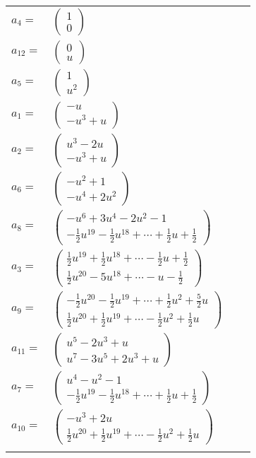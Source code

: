 \documentclass[1p]{elsarticle_modified}
\theoremstyle{definition}
\begin{document}
\begin{tabular}{m{7pt} m{180pt} m{7pt} m{180pt} }
\flushright $a_{4}=$&$\begin{pmatrix}1\\0\end{pmatrix}$ \\
\flushright $a_{12}=$&$\begin{pmatrix}0\\u\end{pmatrix}$ \\
\flushright $a_{5}=$&$\begin{pmatrix}1\\u^2\end{pmatrix}$ \\
\flushright $a_{1}=$&$\begin{pmatrix}- u\\- u^3+u\end{pmatrix}$ \\
\flushright $a_{2}=$&$\begin{pmatrix}u^3-2 u\\- u^3+u\end{pmatrix}$ \\
\flushright $a_{6}=$&$\begin{pmatrix}- u^2+1\\- u^4+2 u^2\end{pmatrix}$ \\
\flushright $a_{8}=$&$\begin{pmatrix}- u^6+3 u^4-2 u^2-1\\-\frac{1}{2} u^{19}-\frac{1}{2} u^{18}+\cdots+\frac{1}{2} u+\frac{1}{2}\end{pmatrix}$ \\
\flushright $a_{3}=$&$\begin{pmatrix}\frac{1}{2} u^{19}+\frac{1}{2} u^{18}+\cdots-\frac{1}{2} u+\frac{1}{2}\\\frac{1}{2} u^{20}-5 u^{18}+\cdots- u-\frac{1}{2}\end{pmatrix}$ \\
\flushright $a_{9}=$&$\begin{pmatrix}-\frac{1}{2} u^{20}-\frac{1}{2} u^{19}+\cdots+\frac{1}{2} u^2+\frac{5}{2} u\\\frac{1}{2} u^{20}+\frac{1}{2} u^{19}+\cdots-\frac{1}{2} u^2+\frac{1}{2} u\end{pmatrix}$ \\
\flushright $a_{11}=$&$\begin{pmatrix}u^5-2 u^3+u\\u^7-3 u^5+2 u^3+u\end{pmatrix}$ \\
\flushright $a_{7}=$&$\begin{pmatrix}u^4- u^2-1\\-\frac{1}{2} u^{19}-\frac{1}{2} u^{18}+\cdots+\frac{1}{2} u+\frac{1}{2}\end{pmatrix}$ \\
\flushright $a_{10}=$&$\begin{pmatrix}- u^3+2 u\\\frac{1}{2} u^{20}+\frac{1}{2} u^{19}+\cdots-\frac{1}{2} u^2+\frac{1}{2} u\end{pmatrix}$\\&\end{tabular}
\end{document}

